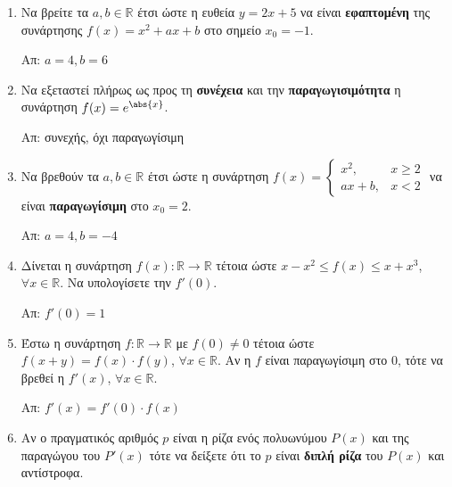 



\pagestyle{askhseis}




\begin{center}
  \minibox{\large \bfseries \textcolor{Col1}{Ασκήσεις στις Παραγώγους}}
\end{center}

\vspace{\baselineskip}

\begin{enumerate}

  \item Να βρείτε τα $ a, b \in \mathbb{R} $ έτσι ώστε η ευθεία $ y = 2x + 5
    $ να είναι \textbf{εφαπτομένη} της συνάρτησης $ f(x) = x^{2} + ax + b $ στο
    σημείο $ x_{0} = -1 $. 

    \hfill Απ: $ a = 4, b = 6 $

  \item Να εξεταστεί πλήρως ως προς τη \textbf{συνέχεια} και την
    \textbf{παραγωγισιμότητα} η συνάρτηση $ f(x) = e^{\abs{x}} $.

    \hfill Απ: συνεχής, όχι παραγωγίσιμη 

  \item Να βρεθούν τα $ a, b \in \mathbb{R} $ έτσι ώστε η συνάρτηση 
    $
    f(x) = \begin{cases}
      x^{2}, & x\geq 2 \\
      ax+b , & x<2
    \end{cases}
    $
    να είναι \textbf{παραγωγίσιμη} στο $ x_{0} = 2 $.

    \hfill Απ: $ a=4, b=-4 $

  \item Δίνεται η συνάρτηση $ f(x) \colon \mathbb{R} \to \mathbb{R} $ τέτοια
    ώστε $ x - x^{2} \leq f(x) \leq x + x^{3} $, $ \forall x \in \mathbb{R}
    $. Να υπολογίσετε την $ f'(0) $.

    \hfill Απ: $ f'(0) = 1 $

  \item Έστω η συνάρτηση $ f \colon \mathbb{R} \to \mathbb{R} $ με $ f(0)
    \neq 0	$ τέτοια ώστε $ f(x+y) = f(x) \cdot f(y) $, $ \forall x \in
    \mathbb{R} $. Αν η $f$ είναι παραγωγίσιμη στο $0$, τότε να βρεθεί η $
    f'(x) $, $ \forall x \in \mathbb{R} $.

    \hfill Απ: $ f'(x) = f'(0)\cdot f(x) $

  \item Αν ο πραγματικός αριθμός $p$ είναι η ρίζα ενός πολυωνύμου $ P(x)
    $ και της παραγώγου του $ P'(x) $ τότε να δείξετε ότι το $p$ είναι \textbf{διπλή
    ρίζα} του $ P(x) $ και αντίστροφα.


\end{enumerate}

